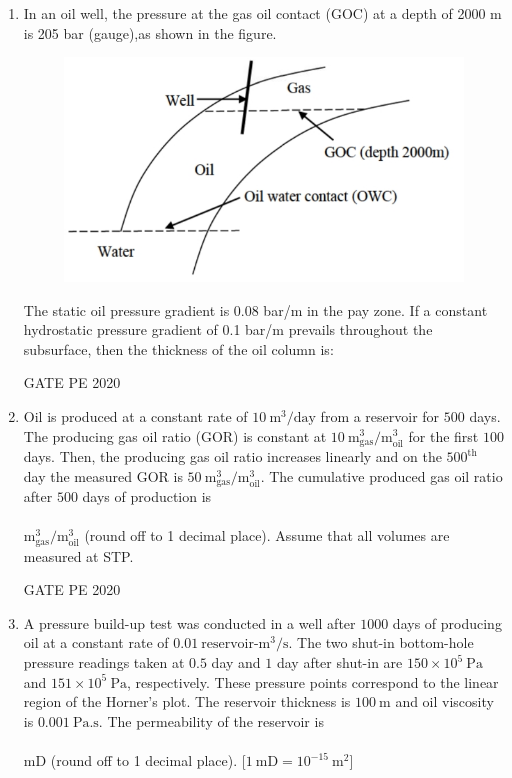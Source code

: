 \documentclass[journal,12pt,onecolumn]{IEEEtran}
\theoremstyle{remark}
\begin{document}
\begin{enumerate}
\item In an oil well, the pressure at the gas oil contact (GOC) at a depth of 2000 m is 205 bar (gauge),as shown in the figure.
\begin{figure}[h]
    \centering
    \includegraphics[width=0.5\linewidth]{figs/8.jpeg}
    \caption{}
    \label{fig:placeholder}
\end{figure}


The static oil pressure gradient is 0.08 bar/m in the pay zone. If a constant hydrostatic pressure gradient of 0.1 bar/m prevails throughout the subsurface, then the thickness of the oil column is:


  \hfill{GATE PE 2020}
 
\item Oil is produced at a constant rate of $10 \ \text{m}^3/\text{day}$ from a reservoir for $500$ days.  
The producing gas oil ratio (GOR) is constant at $10 \ \text{m}^3_{\text{gas}}/\text{m}^3_{\text{oil}}$ for the first $100$ days.  
Then, the producing gas oil ratio increases linearly and on the $500^{\text{th}}$ day the measured GOR is $50 \ \text{m}^3_{\text{gas}}/\text{m}^3_{\text{oil}}$.  
The cumulative produced gas oil ratio after $500$ days of production is \\\\ $\text{m}^3_{\text{gas}}/\text{m}^3_{\text{oil}}$ (round off to 1 decimal place).  
Assume that all volumes are measured at STP.  

  \hfill{GATE PE 2020}

 
\item A pressure build-up test was conducted in a well after $1000$ days of producing oil at a constant rate of $0.01 \ \text{reservoir-m}^3/\text{s}$.  
The two shut-in bottom-hole pressure readings taken at $0.5$ day and $1$ day after shut-in are $150 \times 10^5 \ \text{Pa}$ and $151 \times 10^5 \ \text{Pa}$, respectively.  
These pressure points correspond to the linear region of the Horner's plot.  
The reservoir thickness is $100 \ \text{m}$ and oil viscosity is $0.001 \ \text{Pa.s}$.  
The permeability of the reservoir is \\\\ mD (round off to 1 decimal place).  
[$1 \ \text{mD} = 10^{-15} \ \text{m}^2$]  



\end{enumerate}
\end{document}
